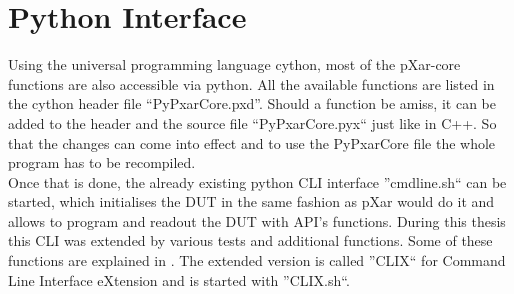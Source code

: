 \section{Python Interface}
Using the universal programming language cython, most of the pXar-core functions are also accessible via python. All the available functions are listed in the cython header file ``PyPxarCore.pxd''. Should a function be amiss, it can be added to the header and the source file ``PyPxarCore.pyx`` just like in C++. So that the changes can come into effect and to use the PyPxarCore file the whole program has to be recompiled.\\
Once that is done, the already existing python \ac{CLI} interface ''cmdline.sh`` can be started, which initialises the \ac{DUT} in the same fashion as pXar would do it and allows to program and readout the \ac{DUT} with \ac{API}'s functions. During this thesis this \ac{CLI} was extended by various tests and additional functions. Some of these functions are explained in . The extended version is called ''CLIX`` for Command Line Interface eXtension and is started with ''CLIX.sh``.
